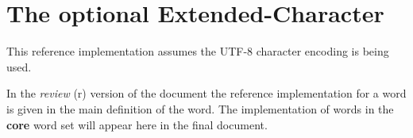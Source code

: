 \section[The optional Extended-Character word set]{The optional Extended-Character } %
\label{imp:xchar}

This reference implementation assumes the UTF-8 character encoding
is being used.

\ifinline
	\begin{editor}
		In the \emph{review} (r) version of the document the
		reference implementation for a word is given in the main
		definition of the word.  The implementation of words
		in the \textbf{core} word set will appear here in the
		final document.
	\end{editor}
\else
	
\fi
